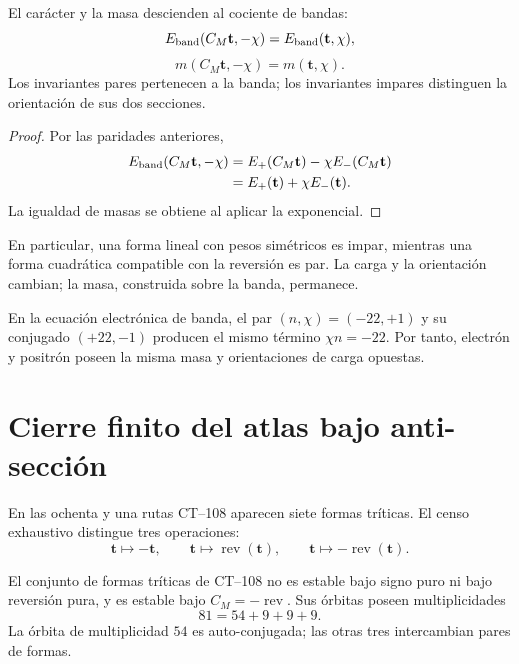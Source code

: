 \begin{theorem}
\label{thm:principio-conjugacion-masa-banda}
El carácter y la masa descienden al cociente de bandas:
\[
E_{\rm band}(C_M\mathbf t,-\chi)
=E_{\rm band}(\mathbf t,\chi),
\]
\[
\boxed{
m(C_M\mathbf t,-\chi)=m(\mathbf t,\chi).}
\]
Los invariantes pares pertenecen a la banda; los invariantes impares
distinguen la orientación de sus dos secciones.
\end{theorem}

\begin{proof}
Por las paridades anteriores,
\[
\begin{aligned}
E_{\rm band}(C_M\mathbf t,-\chi)
&=E_+(C_M\mathbf t)-\chi E_-(C_M\mathbf t)\\
&=E_+(\mathbf t)+\chi E_-(\mathbf t).
\end{aligned}
\]
La igualdad de masas se obtiene al aplicar la exponencial.
\end{proof}

En particular, una forma lineal con pesos simétricos es impar, mientras una
forma cuadrática compatible con la reversión es par. La carga y la
orientación cambian; la masa, construida sobre la banda, permanece.

\begin{corollary}
\label{cor:electron-positron-banda}
En la ecuación electrónica de banda, el par
\((n,\chi)=(-22,+1)\) y su conjugado \((+22,-1)\) producen el mismo término
\(\chi n=-22\). Por tanto, electrón y positrón poseen la misma masa y
orientaciones de carga opuestas.
\end{corollary}

\section{Cierre finito del atlas bajo anti-sección}

En las ochenta y una rutas CT--108 aparecen siete formas tríticas. El censo
exhaustivo distingue tres operaciones:
\[
\mathbf t\longmapsto-\mathbf t,\qquad
\mathbf t\longmapsto\operatorname{rev}(\mathbf t),\qquad
\mathbf t\longmapsto-\operatorname{rev}(\mathbf t).
\]

\begin{proposition}
\label{prop:cierre-antiseccion-ct108}
El conjunto de formas tríticas de CT--108 no es estable bajo signo puro ni
bajo reversión pura, y es estable bajo \(C_M=-\operatorname{rev}\). Sus
órbitas poseen multiplicidades
\[
\boxed{81=54+9+9+9.}
\]
La órbita de multiplicidad \(54\) es auto-conjugada; las otras tres
intercambian pares de formas.
\end{proposition}

